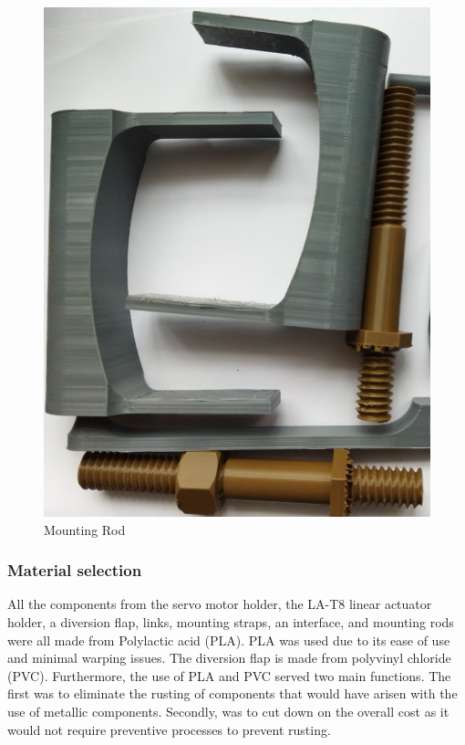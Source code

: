 \begin{enumerate}
\begin{figure}[H]
\includegraphics [height=.6\textheight] {Figures/de.jpg}
\caption{Mounting Rod}
\label{fig: 3D printed Mounting Rod}
\end{figure}
\end{enumerate}

\subsubsection{Material selection}
All the components from the servo motor holder, the LA-T8 linear actuator holder, a diversion flap, links, mounting straps, an interface, and mounting rods were all made from Polylactic acid (PLA). PLA was used due to its ease of use and minimal warping issues. The diversion flap is made from polyvinyl chloride (PVC). Furthermore, the use of PLA and PVC served two main functions. The first was to eliminate the rusting of components that would have arisen with the use of metallic components. Secondly, was to cut down on the overall cost as it would not require preventive processes to prevent rusting.
